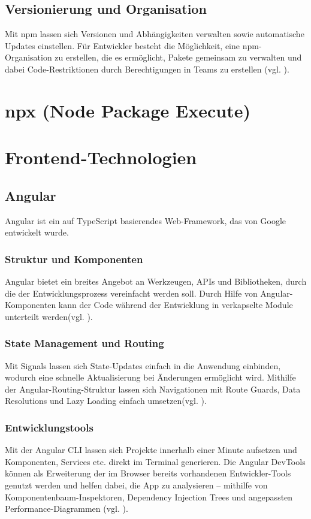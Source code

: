 \documentclass[oneside]{ausarbeitung}
\begin{document}
\subsection{Versionierung und Organisation}
Mit npm lassen sich Versionen und Abhängigkeiten verwalten sowie automatische Updates einstellen. Für Entwickler besteht die Möglichkeit, eine npm-Organisation zu erstellen, die es ermöglicht, Pakete gemeinsam zu verwalten und dabei Code-Restriktionen durch Berechtigungen in Teams zu erstellen (vgl. \parencite{npm}).

\section{npx (Node Package Execute)}

\section{Frontend-Technologien}

\subsection{Angular}
Angular ist ein auf TypeScript basierendes Web-Framework, das von Google entwickelt wurde. 

\subsubsection{Struktur und Komponenten}
Angular bietet ein breites Angebot an Werkzeugen, APIs und Bibliotheken, durch die der Entwicklungsprozess vereinfacht werden soll. Durch Hilfe von Angular-Komponenten kann der Code während der Entwicklung in verkapselte Module unterteilt werden(vgl. \parencite{angular}).

\subsubsection{State Management und Routing}
Mit Signals lassen sich State-Updates einfach in die Anwendung einbinden, wodurch eine schnelle Aktualisierung bei Änderungen ermöglicht wird. Mithilfe der Angular-Routing-Struktur lassen sich Navigationen mit Route Guards, Data Resolutions und Lazy Loading einfach umsetzen(vgl. \parencite{angular}).

\subsubsection{Entwicklungstools}
Mit der Angular CLI lassen sich Projekte innerhalb einer Minute aufsetzen und Komponenten, Services etc. direkt im Terminal generieren. Die Angular DevTools können als Erweiterung der im Browser bereits vorhandenen Entwickler-Tools genutzt werden und helfen dabei, die App zu analysieren – mithilfe von Komponentenbaum-Inspektoren, Dependency Injection Trees und angepassten Performance-Diagrammen (vgl. \parencite{angular}).
\end{document}
